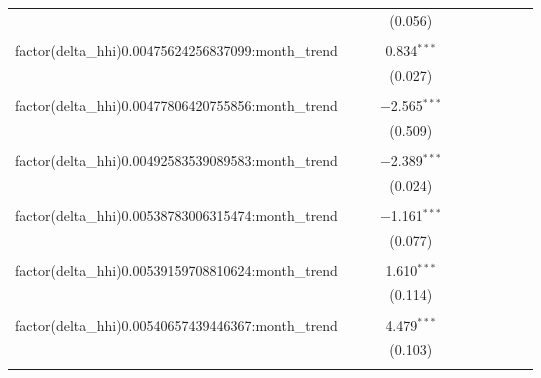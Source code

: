 \begin{table}[H]
{\begin{tabular}{@{\extracolsep{5pt}}lccccccccc}
   &  &  & (0.056) &  &  &  &  &  &  \\  

   & & & & & & & & & \\  

  factor(delta\_hhi)0.00475624256837099:month\_trend &  &  & 0.834$^{***}$ &  &  &  &  &  &  \\  

   &  &  & (0.027) &  &  &  &  &  &  \\  

   & & & & & & & & & \\  

  factor(delta\_hhi)0.00477806420755856:month\_trend &  &  & $-$2.565$^{***}$ &  &  &  &  &  &  \\  

   &  &  & (0.509) &  &  &  &  &  &  \\  

   & & & & & & & & & \\  

  factor(delta\_hhi)0.00492583539089583:month\_trend &  &  & $-$2.389$^{***}$ &  &  &  &  &  &  \\  

   &  &  & (0.024) &  &  &  &  &  &  \\  

   & & & & & & & & & \\  

  factor(delta\_hhi)0.00538783006315474:month\_trend &  &  & $-$1.161$^{***}$ &  &  &  &  &  &  \\  

   &  &  & (0.077) &  &  &  &  &  &  \\  

   & & & & & & & & & \\  

  factor(delta\_hhi)0.00539159708810624:month\_trend &  &  & 1.610$^{***}$ &  &  &  &  &  &  \\  

   &  &  & (0.114) &  &  &  &  &  &  \\  

   & & & & & & & & & \\  

  factor(delta\_hhi)0.00540657439446367:month\_trend &  &  & 4.479$^{***}$ &  &  &  &  &  &  \\  

   &  &  & (0.103) &  &  &  &  &  &  \\  

   & & & & & & & & & \\  


\end{tabular}}
\end{table}
